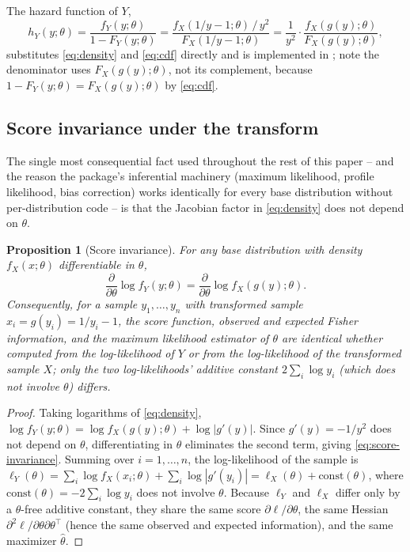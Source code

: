 \documentclass[article]{jss}
\newtheorem{proposition}{Proposition}
\begin{document}
The hazard function of $Y$,
\begin{equation}
  h_Y(y;\theta) = \frac{f_Y(y;\theta)}{1-F_Y(y;\theta)}
  = \frac{f_X(1/y-1;\theta)\,/\,y^2}{F_X(1/y-1;\theta)}
  = \frac{1}{y^2}\cdot\frac{f_X(g(y);\theta)}{F_X(g(y);\theta)},
  \label{eq:hazard}
\end{equation}
substitutes \eqref{eq:density} and \eqref{eq:cdf} directly and is implemented in ; note the denominator uses $F_X(g(y);\theta)$, not its complement, because $1-F_Y(y;\theta) = F_X(g(y);\theta)$ by \eqref{eq:cdf}.

\subsection{Score invariance under the transform}
\label{sec:scoreinvariance}

The single most consequential fact used throughout the rest of this paper -- and the reason the package's inferential machinery (maximum likelihood, profile likelihood, bias correction) works identically for every base distribution without per-distribution code -- is that the Jacobian factor in \eqref{eq:density} does not depend on $\theta$.

\begin{proposition}[Score invariance]
\label{prop:scoreinvariance}
For any base distribution with density $f_X(x;\theta)$ differentiable in $\theta$,
\begin{equation}
  \frac{\partial}{\partial\theta}\log f_Y(y;\theta) = \frac{\partial}{\partial\theta}\log f_X(g(y);\theta).
  \label{eq:score-invariance}
\end{equation}
Consequently, for a sample $y_1,\dots,y_n$ with transformed sample $x_i = g(y_i) = 1/y_i-1$, the score function, observed and expected Fisher information, and the maximum likelihood estimator of $\theta$ are identical whether computed from the log-likelihood of $Y$ or from the log-likelihood of the transformed sample $X$; only the two log-likelihoods' additive constant $2\sum_i\log y_i$ (which does not involve $\theta$) differs.
\end{proposition}
\begin{proof}
Taking logarithms of \eqref{eq:density}, $\log f_Y(y;\theta) = \log f_X(g(y);\theta) + \log|g'(y)|$. Since $g'(y) = -1/y^2$ does not depend on $\theta$, differentiating in $\theta$ eliminates the second term, giving \eqref{eq:score-invariance}. Summing over $i=1,\dots,n$, the log-likelihood of the sample is $\ell_Y(\theta) = \sum_i \log f_X(x_i;\theta) + \sum_i \log|g'(y_i)| = \ell_X(\theta) + \text{const}(\theta)$, where $\text{const}(\theta) = -2\sum_i\log y_i$ does not involve $\theta$. Because $\ell_Y$ and $\ell_X$ differ only by a $\theta$-free additive constant, they share the same score $\partial\ell/\partial\theta$, the same Hessian $\partial^2\ell/\partial\theta\partial\theta^\top$ (hence the same observed and expected information), and the same maximizer $\hat\theta$.
\end{proof}
\end{document}
